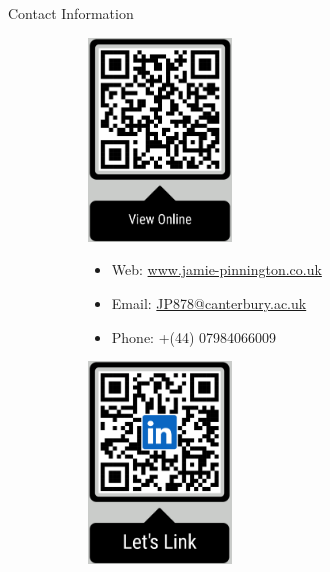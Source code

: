 \documentclass{beamer} %
\begin{document}
\begin{frame}[t]
\begin{columns}[t]
\begin{column}{0.3\textwidth}


			\begin{block}{Contact Information}
				\begin{figure}
					\begin{subfigure}[t]{0.25\linewidth}
						\centering
						\includegraphics[width=1.5in,valign=t]{qr_online_v6.png}
					\end{subfigure}
					\begin{subfigure}[t]{0.45\linewidth}
						\begin{itemize}
							\item Web: \href{https://www.jamie-pinnington.co.uk}{www.jamie-pinnington.co.uk}
							\item Email: \href{mailto:JP878@canterbury.ac.uk}{JP878@canterbury.ac.uk}
							\item Phone: +(44) 07984066009
						\end{itemize}
					\end{subfigure}
					\begin{subfigure}[t]{0.25\linewidth}
						\centering
						\includegraphics[width=1.5in,valign=t]{qr_linked_v5.png}
					\end{subfigure}
				\end{figure}
			\end{block}


\end{column}
\end{columns}
\end{frame}
\end{document}
